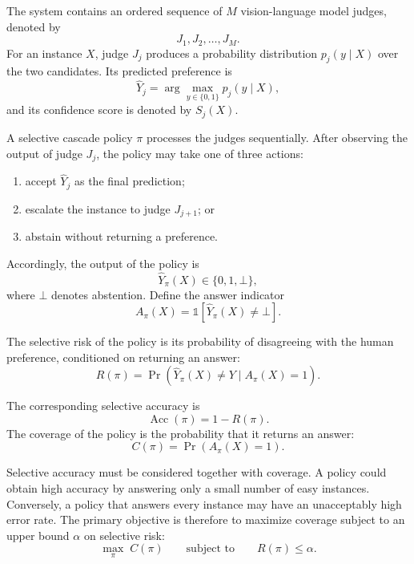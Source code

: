 \documentclass[11pt]{article}
\begin{document}
The system contains an ordered sequence of $M$ vision-language model judges,
denoted by
\[
    J_1,J_2,\ldots,J_M.
\]
For an instance $X$, judge $J_j$ produces a probability distribution
$p_j(y\mid X)$ over the two candidates. Its predicted preference is
\[
    \widehat{Y}_j
    =
    \arg\max_{y\in\{0,1\}}p_j(y\mid X),
\]
and its confidence score is denoted by $S_j(X)$.

A selective cascade policy $\pi$ processes the judges sequentially. After
observing the output of judge $J_j$, the policy may take one of three actions:

\begin{enumerate}
    \item accept $\widehat{Y}_j$ as the final prediction;
    \item escalate the instance to judge $J_{j+1}$; or
    \item abstain without returning a preference.
\end{enumerate}

Accordingly, the output of the policy is
\[
    \widehat{Y}_{\pi}(X)\in\{0,1,\bot\},
\]
where $\bot$ denotes abstention. Define the answer indicator
\[
    A_{\pi}(X)
    =
    \mathbb{1}\!\left[\widehat{Y}_{\pi}(X)\neq\bot\right].
\]

The selective risk of the policy is its probability of disagreeing with the
human preference, conditioned on returning an answer:
\begin{equation}
    R(\pi)
    =
    \Pr\!\left(
        \widehat{Y}_{\pi}(X)\neq Y
        \mid A_{\pi}(X)=1
    \right).
    \label{eq:problem-selective-risk}
\end{equation}

The corresponding selective accuracy is
\[
    \operatorname{Acc}(\pi)=1-R(\pi).
\]
The coverage of the policy is the probability that it returns an answer:
\begin{equation}
    C(\pi)
    =
    \Pr\!\left(A_{\pi}(X)=1\right).
    \label{eq:problem-coverage}
\end{equation}

Selective accuracy must be considered together with coverage. A policy could
obtain high accuracy by answering only a small number of easy instances.
Conversely, a policy that answers every instance may have an unacceptably high
error rate. The primary objective is therefore to maximize coverage subject
to an upper bound $\alpha$ on selective risk:
\begin{equation}
    \max_{\pi}\; C(\pi)
    \qquad
    \text{subject to}
    \qquad
    R(\pi)\leq\alpha.
    \label{eq:problem-objective}
\end{equation}
\end{document}
